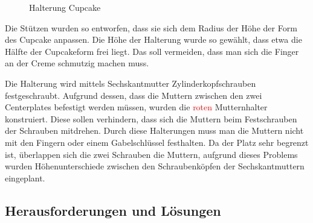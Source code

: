 	\begin{figure}[H]
	  \begin{centering}
	  \par\end{centering}
	  \caption{Halterung Cupcake}
	  \label{Halterung_Cupcake}
	\end{figure}

	Die Stützen wurden so entworfen, dass sie sich dem Radius \bzw der Höhe der Form des Cupcake anpassen. Die Höhe der Halterung wurde so gewählt, dass etwa die Hälfte der Cupcakeform frei liegt.
	Das soll vermeiden, dass man sich die Finger an der Creme schmutzig machen muss.

	Die Halterung wird mittels Sechskantmutter \bzw Zylinderkopfschrauben festgeschraubt. Aufgrund dessen, dass die Muttern zwischen den zwei Centerplates befestigt werden müssen, wurden die \textcolor{red}{roten} Mutternhalter konstruiert.
	Diese sollen verhindern, dass sich die Muttern beim Festschrauben der Schrauben mitdrehen. Durch diese Halterungen muss man die Muttern nicht mit den Fingern oder einem Gabelschlüssel festhalten.
	Da der Platz sehr begrenzt ist, überlappen sich die zwei Schrauben \bzw die Muttern, aufgrund dieses Problems wurden Höhenunterschiede zwischen den Schraubenköpfen \bzw der Sechskantmuttern eingeplant.

		\newpage

	\subsection{Herausforderungen und Lösungen}

